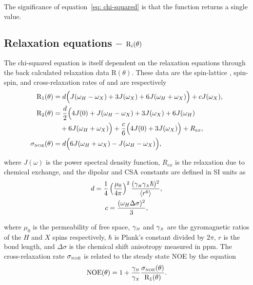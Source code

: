 The significance of equation~\eqref{eq: chi-squared} is that the function returns a single value.


\subsection{Relaxation equations -- $\mathrm{R}_i(\theta)$}

The chi-squared equation is itself dependent on the relaxation equations through the back calculated relaxation data R$(\theta)$.  These data are the spin-lattice , spin-spin, and cross-relaxation rates of \citet{Abragam61} and are respectively
\begin{align}
 \mathrm{R}_1(\theta) &= d \Big( J(\omega_H - \omega_X) + 3J(\omega_X) + 6J(\omega_H + \omega_X) \Big) + cJ(\omega_X),     \label{eq: R1} \\
 \mathrm{R}_2(\theta) &= \frac{d}{2} \Big( 4J(0) + J(\omega_H - \omega_X) + 3J(\omega_X) + 6J(\omega_H)                    \nonumber \\
     &  \quad + 6J(\omega_H + \omega_X) \Big) + \frac{c}{6} \Big( 4J(0) + 3J(\omega_X) \Big) + R_{ex},              \label{eq: R2} \\  
 \sigma_{\scriptscriptstyle \mathrm{NOE}}(\theta) &= d \Big( 6J(\omega_H + \omega_X) - J(\omega_H - \omega_X) \Big),                              \label{eq: sigma_NOE}
\end{align}

\noindent where $J(\omega)$ is the power spectral density function, $R_{ex}$ is the relaxation due to chemical exchange, and the dipolar and CSA constants are defined in SI units as
\begin{gather}
 d = \frac{1}{4} \left(\frac{\mu_0}{4\pi}\right)^2 \frac{(\gamma_{\scriptscriptstyle H} \gamma_{\scriptscriptstyle X} \hbar)^2}{\langle r^6 \rangle}, \label{eq: dipolar constant} \\
 c = \frac{(\omega_H \Delta\sigma)^2}{3}, \label{eq: CSA constant}
\end{gather}

\noindent where $\mu_0$ is the permeability of free space, $\gamma_{\scriptscriptstyle H}$ and $\gamma_{\scriptscriptstyle X}$ are the gyromagnetic ratios of the $H$ and $X$ spins respectively, $\hbar$ is Plank's constant divided by $2\pi$, $r$ is the bond length, and $\Delta\sigma$ is the chemical shift anisotropy measured in ppm.  The cross-relaxation rate $\sigma_{\scriptscriptstyle \mathrm{NOE}}$ is related to the steady state NOE by the equation
\begin{equation} \label{eq: NOE}
 \mathrm{NOE}(\theta) = 1 + \frac{\gamma_{\scriptscriptstyle H}}{\gamma_{\scriptscriptstyle X}} \frac{\sigma_{\scriptscriptstyle \mathrm{NOE}}(\theta)}{\mathrm{R}_1(\theta)}.
\end{equation}


